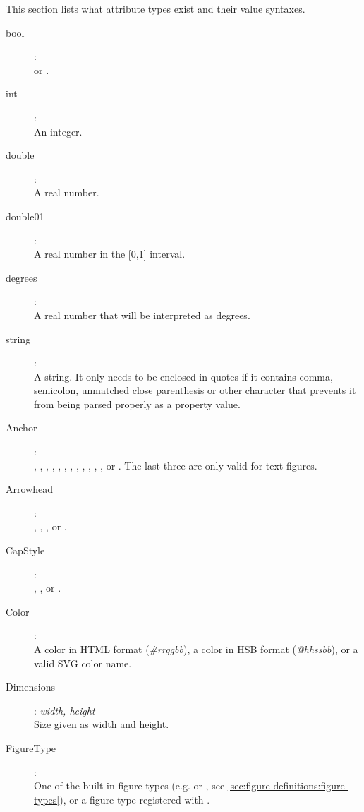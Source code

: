 This section lists what attribute types exist and their value syntaxes.

\begin{description}

\item[bool]: \\
 or .

\item[int]: \\
An integer.

\item[double]: \\
A real number.

\item[double01]: \\
A real number in the [0,1] interval.

\item[degrees]: \\
A real number that will be interpreted as degrees.

\item[string]: \\
A string. It only needs to be enclosed in quotes if it contains comma,
semicolon, unmatched close parenthesis or other character that prevents
it from being parsed properly as a property value.

\item[Anchor]: \\
, , , , , , ,
, , , , , or .
The last three are only valid for text figures.

\item[Arrowhead]: \\
, , , or .

\item[CapStyle]: \\
, , or .

\item[Color]: \\
A color in HTML format (\textit{\#rrggbb}), a color in
HSB format (\textit{@hhssbb}), or a valid SVG color name.

\item[Dimensions]: \textit{width, height} \\
Size given as width and height.

\item[FigureType]: \\
One of the built-in figure types (e.g.  or , see
\ref{sec:figure-definitions:figure-types}), or a figure type registered
with .


\end{description}
